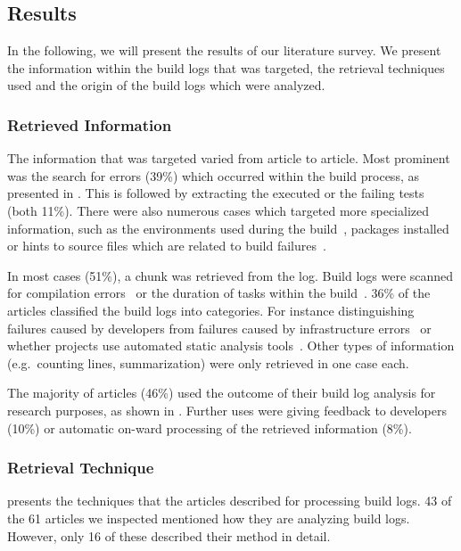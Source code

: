 \subsection{Results}
In the following, we will present the results of our literature survey.
We present the information within the build logs that was targeted,
the retrieval techniques used and the origin of the build logs
which were analyzed.

\subsubsection{Retrieved Information}
The information that was targeted varied from article to article.
Most prominent was the search for errors (39\%) which occurred within
the build process, as presented in .
This is followed by extracting the executed or the failing
tests (both 11\%).
There were also numerous cases which targeted more specialized
information, such as the environments used during the
build~\cite{zolfagharinia2017not}, packages
installed~\cite{selberg2012use} or hints to source files which are
related to build failures~\cite{ren2018automated}.

In most cases (51\%), a chunk was retrieved from the log.
Build logs were scanned for compilation
errors~\cite{clemencic2014new} or
the duration of tasks within the build~\cite{zhang2016android}.
36\% of the articles classified the build logs into categories.
For instance distinguishing failures caused by developers from
failures caused
by infrastructure errors~\cite{lindqvist2019detection} or
whether projects use automated static analysis
tools~\cite{kavaler2019tool}.
Other types of information (e.g.\ counting
lines, summarization) were only retrieved
in one case each.

The majority of articles (46\%) used the outcome of their build log
analysis for research purposes, as shown in .
Further uses were giving feedback to developers (10\%) or automatic
on-ward processing of the retrieved information (8\%).

\subsubsection{Retrieval Technique}
 presents the techniques that the articles
described for processing build logs.
43 of the 61 articles we inspected mentioned how they are analyzing build
logs.
However, only 16 of these described their method in detail.

